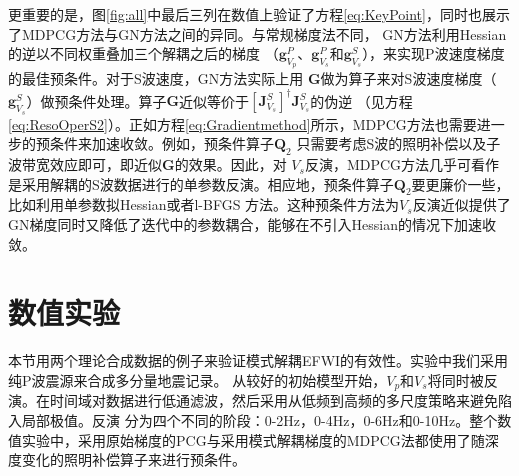 更重要的是，图\ref{fig:all}中最后三列在数值上验证了方程\eqref{eq:KeyPoint}，同时也展示了MDPCG方法与GN方法之间的异同。与常规梯度法不同，
GN方法利用Hessian的逆以不同权重叠加三个解耦之后的梯度
（$\mathbf{g}^P_{V_p}$、$\mathbf{g}^P_{V_s}$和$\mathbf{g}^S_{V_s}$），来实现P波速度梯度的最佳预条件。对于S波速度，GN方法实际上用
$\mathbf{G}$做为算子来对S波速度梯度（$\mathbf{g}^S_{V_s}$）做预条件处理。算子$\mathbf{G}$近似等价于$[\mathbf{J}^{S}_{V_s}]^{\dagger}\mathbf{J}^{S}_{V_s}$的伪逆
（见方程\ref{eq:ResoOperS2}）。正如方程\eqref{eq:Gradientmethod}所示，MDPCG方法也需要进一步的预条件来加速收敛。例如，预条件算子$\mathbf{Q}_2$
只需要考虑S波的照明补偿以及子波带宽效应即可，即近似$\mathbf{G}$的效果。因此，对
$V_s$反演，MDPCG方法几乎可看作是采用解耦的S波数据进行的单参数反演。相应地，预条件算子$\mathbf{Q}_2$要更廉价一些，比如利用单参数拟Hessian或者l-BFGS
方法。这种预条件方法为$V_s$反演近似提供了GN梯度同时又降低了迭代中的参数耦合，能够在不引入Hessian的情况下加速收敛。

\section{数值实验}
本节用两个理论合成数据的例子来验证模式解耦EFWI的有效性。实验中我们采用纯P波震源来合成多分量地震记录。
从较好的初始模型开始，$V_p$和$V_s$将同时被反演。在时间域对数据进行低通滤波，然后采用从低频到高频的多尺度策略来避免陷入局部极值。反演
分为四个不同的阶段：0-2Hz，0-4Hz，0-6Hz和0-10Hz。整个数值实验中，采用原始梯度的PCG与采用模式解耦梯度的MDPCG法都使用了随深度变化的照明补偿算子来进行预条件\cite[]{kohn:2012}。
